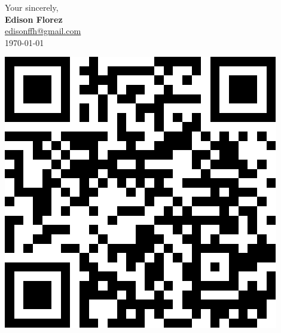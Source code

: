 \vfill
\begin{minipage}[c]{.75\textwidth}
    Your sincerely,\\[5mm]
    \textbf{Edison Florez}\\
    \underline{edisonffh@gmail.com}\\
    \today
\end{minipage}
\begin{minipage}[c]{.2\textwidth}
    \centering
    \href{
        https://sites.google.com/view/edisonflorez/home
    }{
        \includegraphics[scale=0.2]{figs/qr_google_sites.pdf}
    }
\end{minipage}
